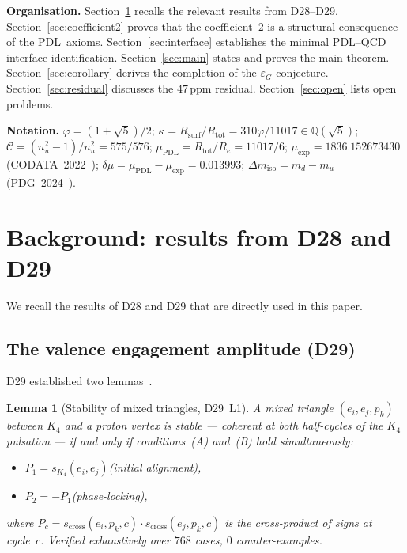 \documentclass[11pt,a4paper]{article}
\newtheorem{lemma}[theorem]{Lemma}
\theoremstyle{definition}
\newcommand{\PDL}{\textnormal{PDL}}
\newcommand{\Rsurf}{R_{\mathrm{surf}}}
\newcommand{\Rtot}{R_{\mathrm{tot}}}
\newcommand{\epsg}{\varepsilon_G}
\newcommand{\Kfour}{K_4}
\newcommand{\vp}{\varphi}
\newcommand{\muPDL}{\mu_{\mathrm{PDL}}}
\newcommand{\muexp}{\mu_{\mathrm{exp}}}
\newcommand{\dmu}{\delta\mu}
\newcommand{\dmiso}{\Delta m_{\mathrm{iso}}}
\newcommand{\Ree}{R_e}
\newcommand{\kap}{\kappa}
\newcommand{\calC}{\mathcal{C}}
\begin{document}
\medskip\noindent\textbf{Organisation.} Section~\ref{sec:background} recalls the relevant results from D28--D29. Section~\ref{sec:coefficient2} proves that the coefficient~$2$ is a structural consequence of the \PDL\ axioms. Section~\ref{sec:interface} establishes the minimal \PDL--QCD interface identification. Section~\ref{sec:main} states and proves the main theorem. Section~\ref{sec:corollary} derives the completion of the $\epsg$ conjecture. Section~\ref{sec:residual} discusses the $47\,\mathrm{ppm}$ residual. Section~\ref{sec:open} lists open problems.

\medskip\noindent\textbf{Notation.} $\vp = (1+\sqrt{5})/2$; $\kap = \Rsurf/\Rtot = 310\vp/11017 \in \mathbb{Q}(\sqrt{5})$; $\calC = (n_u^2-1)/n_u^2 = 575/576$; $\muPDL = \Rtot/\Ree = 11017/6$; $\muexp = 1836.152673430$ (CODATA~2022~\cite{CODATA_2022}); $\dmu = \muPDL - \muexp = 0.013993$; $\dmiso = m_d - m_u$ (PDG~2024~\cite{PDG_2024}).

\section{Background: results from D28 and D29}
\label{sec:background}

We recall the results of D28 and D29 that are directly used in this paper.

\subsection{The valence engagement amplitude (D29)}
\label{subsec:D29}

D29 established two lemmas~\cite{PDL_D29_2026}.

\begin{lemma}[Stability of mixed triangles, D29~L1]
\label{lem:L1}
A mixed triangle $(e_i, e_j, p_k)$ between $\Kfour$ and a proton vertex is stable --- coherent at both half-cycles of the $\Kfour$ pulsation --- if and only if conditions~(A) and~(B) hold simultaneously:
\begin{itemize}
\item[(A)] $P_1 = s_{K_4}(e_i,e_j)$\quad (initial alignment),
\item[(B)] $P_2 = -P_1$\quad (phase-locking),
\end{itemize}
where $P_c = s_{\mathrm{cross}}(e_i,p_k,c)\cdot s_{\mathrm{cross}}(e_j,p_k,c)$ is the cross-product of signs at cycle~$c$. Verified exhaustively over $768$ cases, $0$ counter-examples.
\end{lemma}
\end{document}
